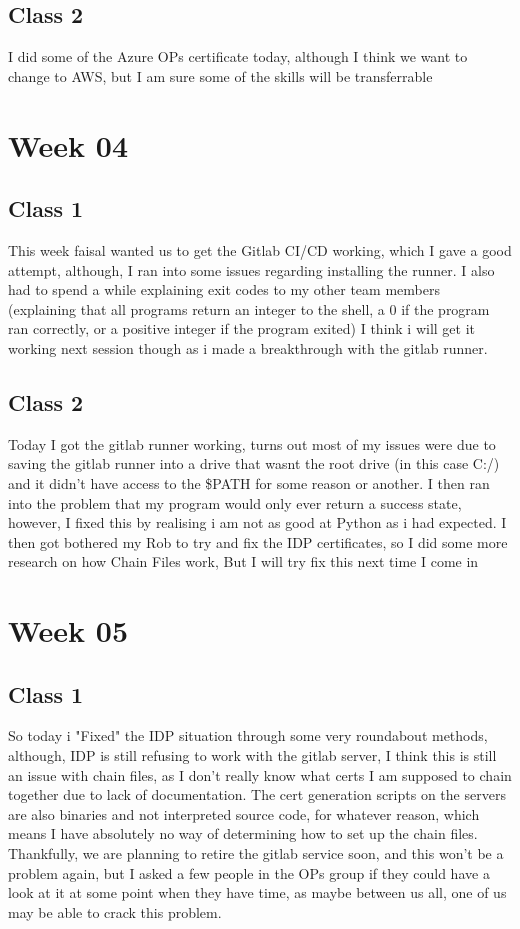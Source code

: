 \documentclass{article}
\begin{document}
\subsection{Class 2}
I did some of the Azure OPs certificate today, although I think we want to change to AWS, but I am sure some of the skills will be transferrable
\section{Week 04}
\subsection{Class 1}
This week faisal wanted us to get the Gitlab CI/CD working, which I gave a good attempt, although, I ran into some issues regarding
installing the runner. I also had to spend a while explaining exit codes to my other team members (explaining that all programs return
an integer to the shell, a 0 if the program ran correctly, or a positive integer if the program exited) I think i will get it working next
session though as i made a breakthrough with the gitlab runner.
\subsection{Class 2}
Today I got the gitlab runner working, turns out most of my issues were due to saving the gitlab runner into a drive that wasnt the 
root drive (in this case C:/) and it didn't have access to the \$PATH for some reason or another. I then ran into the problem that my program
would only ever return a success state, however, I fixed this by realising i am not as good at Python as i had expected. I then got bothered
my Rob to try and fix the IDP certificates, so I did some more research on how Chain Files work, But I will try fix this next time I come in
\section{Week 05}
\subsection{Class 1}
So today i "Fixed" the IDP situation through some very roundabout methods, although, IDP is still refusing to work with the gitlab server, I
think this is still an issue with chain files, as I don't really know what certs I am supposed to chain together due to lack of documentation.
The cert generation scripts on the servers are also binaries and not interpreted source code, for whatever reason, which means I have absolutely
no way of determining how to set up the chain files. Thankfully, we are planning to retire the gitlab service soon, and this won't be a problem
again, but I asked a few people in the OPs group if they could have a look at it at some point when they have time, as maybe between us all, 
one of us may be able to crack this problem.
\end{document}
